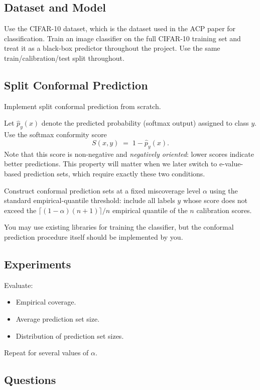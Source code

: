 \documentclass[11pt]{article}
\begin{document}
\subsection{Dataset and Model}

Use the CIFAR-10 dataset, which is the dataset used in the ACP paper for
classification. Train an image classifier on the full CIFAR-10 training set
and treat it as a black-box predictor throughout the project. Use the same
train/calibration/test split throughout.

\subsection{Split Conformal Prediction}

Implement split conformal prediction from scratch.

Let $\hat p_y(x)$ denote the predicted probability (softmax output) assigned
to class $y$. Use the softmax conformity score
\[
  S(x,y) \;=\; 1 - \hat p_y(x).
\]
Note that this score is non-negative and \emph{negatively oriented}: lower
scores indicate better predictions. This property will matter when we later
switch to e-value-based prediction sets, which require exactly these two
conditions.

Construct conformal prediction sets at a fixed miscoverage level $\alpha$
using the standard empirical-quantile threshold: include all labels $y$
whose score does not exceed the $\lceil(1-\alpha)(n+1)\rceil/n$ empirical
quantile of the $n$ calibration scores.

You may use existing libraries for training the classifier, but the conformal
prediction procedure itself should be implemented by you.

\subsection{Experiments}

Evaluate:
\begin{itemize}
  \item Empirical coverage.
  \item Average prediction set size.
  \item Distribution of prediction set sizes.
\end{itemize}
Repeat for several values of $\alpha$.

\subsection{Questions}
\end{document}
